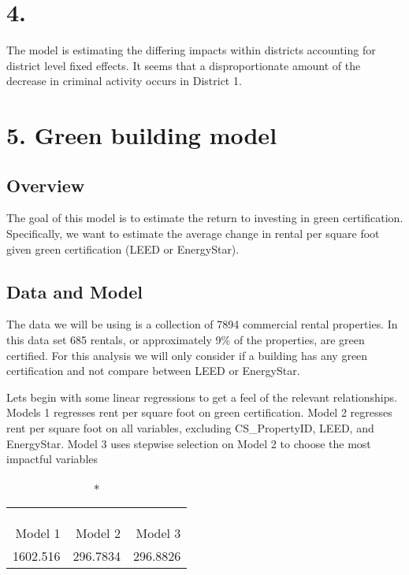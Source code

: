 \documentclass[
]{article}
\begin{document}
\hypertarget{section-3}{%
\section{4.}\label{section-3}}

The model is estimating the differing impacts within districts
accounting for district level fixed effects. It seems that a
disproportionate amount of the decrease in criminal activity occurs in
District 1.

\hypertarget{green-building-model}{%
\section{5. Green building model}\label{green-building-model}}

\hypertarget{overview}{%
\subsection{Overview}\label{overview}}

The goal of this model is to estimate the return to investing in green
certification. Specifically, we want to estimate the average change in
rental per square foot given green certification (LEED or EnergyStar).

\hypertarget{data-and-model}{%
\subsection{Data and Model}\label{data-and-model}}

The data we will be using is a collection of 7894 commercial rental
properties. In this data set 685 rentals, or approximately 9\% of the
properties, are green certified. For this analysis we will only consider
if a building has any green certification and not compare between LEED
or EnergyStar.

Lets begin with some linear regressions to get a feel of the relevant
relationships. Models 1 regresses rent per square foot on green
certification. Model 2 regresses rent per square foot on all variables,
excluding CS\_PropertyID, LEED, and EnergyStar. Model 3 uses stepwise
selection on Model 2 to choose the most impactful variables

\captionsetup[table]{labelformat=empty,skip=1pt}
\begin{longtable}{rrr}
\caption*{
\large RMSE\\ 
\small \\ 
} \\ 
\toprule
Model 1 & Model 2 & Model 3 \\ 
\midrule
1602.516 & 296.7834 & 296.8826 \\ 
\bottomrule
\end{longtable}
\end{document}
